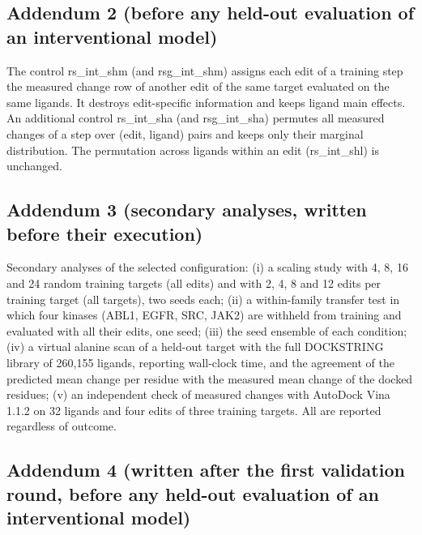 \subsection*{Addendum 2 (before any held-out evaluation of an interventional model)}

The control rs\_int\_shm (and rsg\_int\_shm) assigns each edit of a training step the measured change row of another edit of the same target evaluated on the same ligands. It destroys edit-specific information and keeps ligand main effects. An additional control rs\_int\_sha (and rsg\_int\_sha) permutes all measured changes of a step over (edit, ligand) pairs and keeps only their marginal distribution. The permutation across ligands within an edit (rs\_int\_shl) is unchanged.

\subsection*{Addendum 3 (secondary analyses, written before their execution)}

Secondary analyses of the selected configuration: (i) a scaling study with 4, 8, 16 and 24 random training targets (all edits) and with 2, 4, 8 and 12 edits per training target (all targets), two seeds each; (ii) a within-family transfer test in which four kinases (ABL1, EGFR, SRC, JAK2) are withheld from training and evaluated with all their edits, one seed; (iii) the seed ensemble of each condition; (iv) a virtual alanine scan of a held-out target with the full DOCKSTRING library of 260,155 ligands, reporting wall-clock time, and the agreement of the predicted mean change per residue with the measured mean change of the docked residues; (v) an independent check of measured changes with AutoDock Vina 1.1.2 on 32 ligands and four edits of three training targets. All are reported regardless of outcome.

\subsection*{Addendum 4 (written after the first validation round, before any held-out evaluation of an interventional model)}

